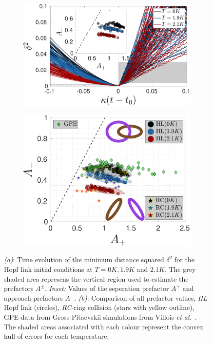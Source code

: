 \documentclass[%
 reprint,
 amsmath,amssymb,
 aps,
 prl,
]{revtex4-2}
\newcommand{\etal}{{\it et al.}~}
\begin{document}
\begin{figure}
	\centering
	\begin{subfigure}[b]{0.45\textwidth}
		\centering
		\includegraphics*[width=\textwidth]{min-delta.pdf}
		\caption{}
		\label{fig: minimum-distance}
	\end{subfigure}
	\begin{subfigure}[b]{0.45\textwidth}
		\centering
		\includegraphics*[width=\textwidth]{prefactors.pdf}
		\caption{}
		\label{fig: prefactors}
	\end{subfigure}
	\caption{\emph{(a)}: Time evolution of the minimum distance squared $\delta^2$ for the Hopf link initial conditions at $T=0K,1.9K$ and $2.1K$. The grey shaded area represens the vertical region used to estimate the prefactors $A^{\pm}$. \emph{Inset:} Values of the seperation prefactor $A^+$ and approach prefactors $A^-$. \emph{(b)}: Comparison of all prefactor values, \emph{HL}-Hopf link (circles), \emph{RC}-ring collision (stars with yellow outline), GPE-data from Gross-Pitaevskii simulations from Villois \etal \cite{villoisIrreversibleDynamicsVortex2020}. The shaded areas associated with each colour represent the convex hull of errors for each temperature. }
\end{figure}
\end{document}
